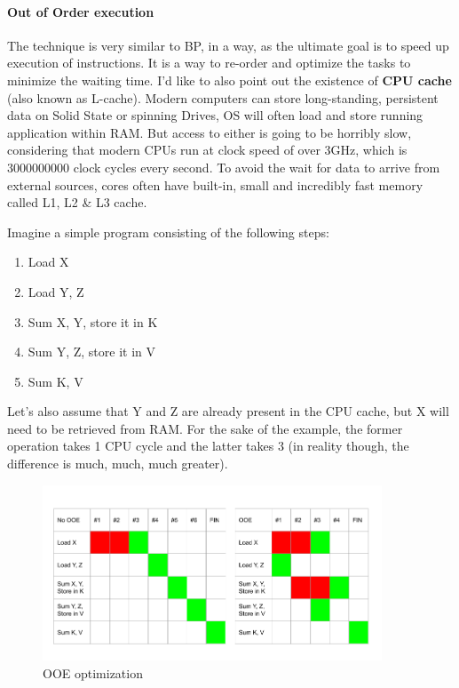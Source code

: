 \documentclass{article}
\begin{document}
\paragraph{Out of Order execution}
The technique is very similar to BP, in a way, as the ultimate goal is to speed up execution of instructions. It is a way to re-order and optimize the tasks to minimize the waiting time. I'd like to also point out the existence of \textbf{CPU cache} (also known as L-cache). Modern computers can store long-standing, persistent data on Solid State or spinning Drives, OS will often load and store running application within RAM. But access to either is going to be horribly slow, considering that modern CPUs run at clock speed of over 3GHz, which is 3000000000 clock cycles every second. To avoid the wait for data to arrive from external sources, cores often have built-in, small and incredibly fast memory called L1, L2 \& L3 cache.

Imagine a simple program consisting of the following steps:
\begin{enumerate}
  \item Load X
  \item Load Y, Z
  \item Sum X, Y, store it in K
  \item Sum Y, Z, store it in V
  \item Sum K, V
\end{enumerate}

Let's also assume that Y and Z are already present in the CPU cache, but X will need to be retrieved from RAM. For the sake of the example, the former operation takes 1 CPU cycle and the latter takes 3 (in reality though, the difference is much, much, much greater).

\begin{figure}[ht]
\centering
\includegraphics[width=0.9\textwidth]{OOE}
  \caption{OOE optimization}
\end{figure}
\end{document}
